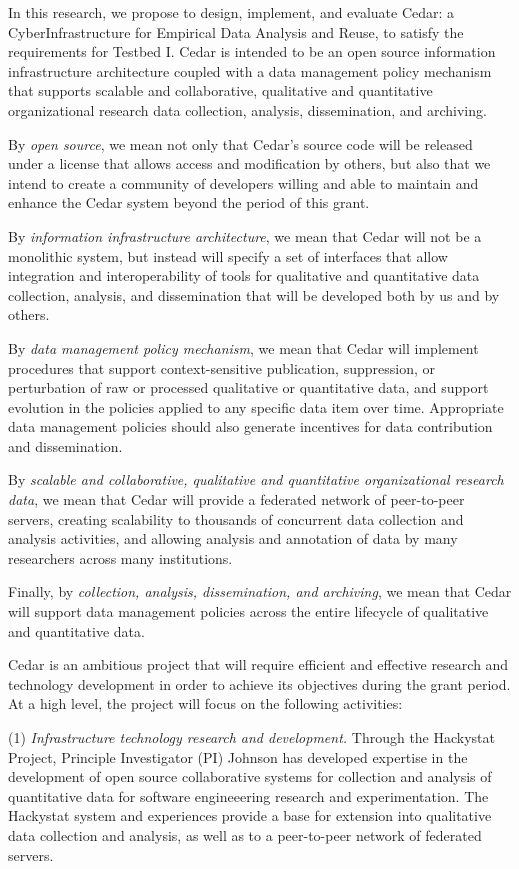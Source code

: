 In this research, we propose to design, implement, and evaluate Cedar: a
CyberInfrastructure for Empirical Data Analysis and Reuse, to satisfy the
requirements for Testbed I.  Cedar is intended to be an open source
information infrastructure architecture coupled with a data management
policy mechanism that supports scalable and collaborative, qualitative and
quantitative organizational research data collection, analysis,
dissemination, and archiving.

By {\em open source}, we mean not only that Cedar's source code will be
released under a license that allows access and modification by others, but
also that we intend to create a community of developers willing and able to
maintain and enhance the Cedar system beyond the period of this grant.

By {\em information infrastructure architecture}, we mean that Cedar will
not be a monolithic system, but instead will specify a set of interfaces that
allow integration and interoperability of tools for qualitative and
quantitative data collection, analysis, and dissemination that will be
developed both by us and by others.

By {\em data management policy mechanism}, we mean that Cedar will
implement procedures that support context-sensitive publication,
suppression, or perturbation of raw or processed qualitative or
quantitative data, and support evolution in the policies applied to any
specific data item over time.  Appropriate data management policies should
also generate incentives for data contribution and dissemination.

By {\em scalable and collaborative, qualitative and quantitative
organizational research data}, we mean that Cedar will provide a
federated network of peer-to-peer servers, creating scalability to 
thousands of concurrent data collection and analysis activities, and
allowing analysis and annotation of data by many researchers across many
institutions.

Finally, by {\em collection, analysis, dissemination, and archiving}, we
mean that Cedar will support data management policies across the entire
lifecycle of qualitative and quantitative data.

Cedar is an ambitious project that will require efficient and effective
research and technology development in order to achieve its objectives
during the grant period.  At a high level, the project will focus on 
the following activities:

(1) {\em Infrastructure technology research and development.}  Through the
Hackystat Project, Principle Investigator (PI) Johnson has
developed expertise in the development of open source
collaborative systems for collection and analysis of quantitative data for
software engineeering research and experimentation.  The Hackystat system
and experiences provide a base for extension into qualitative data
collection and analysis, as well as to a peer-to-peer network of federated
servers.


